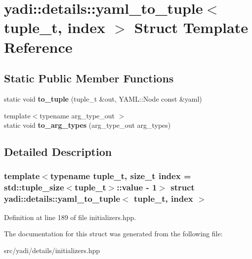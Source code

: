 \hypertarget{structyadi_1_1details_1_1yaml__to__tuple}{}\section{yadi\+:\+:details\+:\+:yaml\+\_\+to\+\_\+tuple$<$ tuple\+\_\+t, index $>$ Struct Template Reference}
\label{structyadi_1_1details_1_1yaml__to__tuple}
\subsection*{Static Public Member Functions}
\begin{DoxyCompactItemize}
\item 
\mbox{\label{structyadi_1_1details_1_1yaml__to__tuple_a0e0419b468a6df3f8f9427e1836d641c}} 
static void {\bfseries to\+\_\+tuple} (tuple\+\_\+t \&out, Y\+A\+M\+L\+::\+Node const \&yaml)
\item 
\mbox{\label{structyadi_1_1details_1_1yaml__to__tuple_ae25dd83334168cf48bf6bcf7d1c942c2}} 
{\footnotesize template$<$typename arg\+\_\+type\+\_\+out $>$ }\\static void {\bfseries to\+\_\+arg\+\_\+types} (arg\+\_\+type\+\_\+out arg\+\_\+types)
\end{DoxyCompactItemize}


\subsection{Detailed Description}
\subsubsection*{template$<$typename tuple\+\_\+t, size\+\_\+t index = std\+::tuple\+\_\+size$<$tuple\+\_\+t$>$\+::value -\/ 1$>$\newline
struct yadi\+::details\+::yaml\+\_\+to\+\_\+tuple$<$ tuple\+\_\+t, index $>$}



Definition at line 189 of file initializers.\+hpp.



The documentation for this struct was generated from the following file\+:\begin{DoxyCompactItemize}
\item 
src/yadi/details/initializers.\+hpp\end{DoxyCompactItemize}
